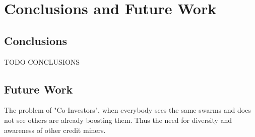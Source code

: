 \chapter{Conclusions and Future Work}
\label{chp:conclusionsandfuturework}

\section{Conclusions}
TODO CONCLUSIONS

\section{Future Work}
The problem of "Co-Investors", when everybody sees the same swarms and does not see others are already boosting them. Thus the need for diversity and awareness of other credit miners.

